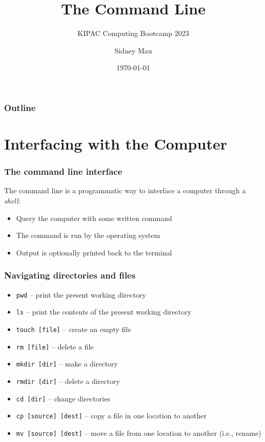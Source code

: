 \documentclass[aspectratio=169]{beamer}
\title{The Command Line}
\subtitle{KIPAC Computing Bootcamp 2023}
\author[S. Mau]{Sidney Mau}
\institute[Stanford]{Stanford University}
\date[\today]{\today}
\begin{document}

\frame{\titlepage}

\begin{frame}
	\frametitle{Outline}
	\tableofcontents
\end{frame}


\section{Interfacing with the Computer}

\frame{\sectionpage}

\begin{frame}
	\frametitle{The command line interface}
	The command line is a programmatic way to interface a computer through a \emph{shell}:
	\begin{itemize}
		\item Query the computer with some written command
		\item The command is run by the operating system
		\item Output is optionally printed back to the terminal
	\end{itemize}
\end{frame}

\begin{frame}
	\frametitle{Navigating directories and files}
	\begin{itemize}
		\item \texttt{pwd} -- print the present working directory
		\item \texttt{ls} -- print the contents of the present working directory
		\item \texttt{touch [file]} -- create an empty file
		\item \texttt{rm [file]} -- delete a file
		\item \texttt{mkdir [dir]} -- make a directory
		\item \texttt{rmdir [dir]} -- delete a directory
		\item \texttt{cd [dir]} -- change directories
		\item \texttt{cp [source] [dest]} -- copy a file in one location to another
		\item \texttt{mv [source] [dest]} -- move a file from one location to another (i.e., rename)
	\end{itemize}
\end{frame}
\end{document}

